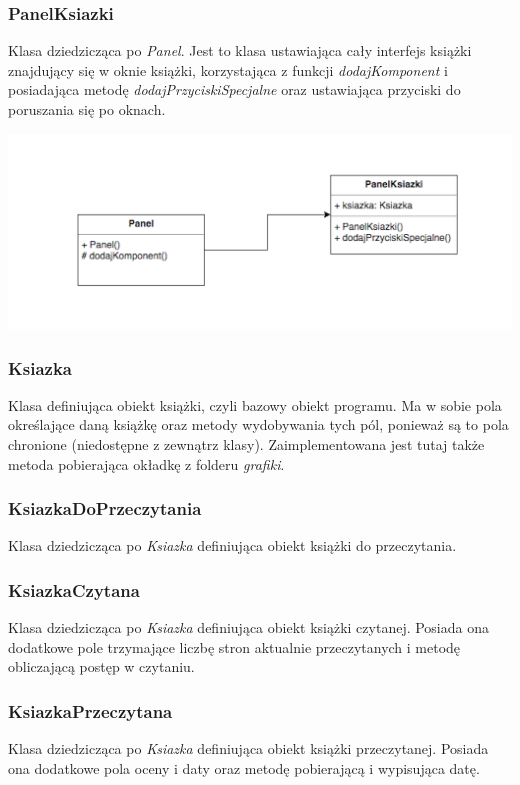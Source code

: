 \documentclass[a4paper,10pt]{article}
\begin{document}
\begin{enumerate}
\subsubsection{PanelKsiazki}
Klasa dziedzicząca po \textit{Panel}. Jest to klasa ustawiająca cały interfejs książki znajdujący się w oknie książki, korzystająca z funkcji \textit{dodajKomponent} i posiadająca metodę \textit{dodajPrzyciskiSpecjalne} oraz ustawiająca przyciski do poruszania się po oknach.

\begin{center}
\includegraphics[scale=0.18]{UML4.png}
\end{center}

\subsubsection{Ksiazka}
Klasa definiująca obiekt książki, czyli bazowy obiekt programu. Ma w sobie pola określające daną książkę oraz metody wydobywania tych pól, ponieważ są to pola chronione (niedostępne z zewnątrz klasy). Zaimplementowana jest tutaj także metoda pobierająca okładkę z folderu \textit{grafiki}.

\subsubsection{KsiazkaDoPrzeczytania}
Klasa dziedzicząca po \textit{Ksiazka} definiująca obiekt książki do przeczytania.

\subsubsection{KsiazkaCzytana} 
Klasa dziedzicząca po \textit{Ksiazka} definiująca obiekt książki czytanej. Posiada ona dodatkowe pole trzymające liczbę stron aktualnie przeczytanych i metodę obliczającą postęp w czytaniu.

\subsubsection{KsiazkaPrzeczytana}
Klasa dziedzicząca po \textit{Ksiazka} definiująca obiekt książki przeczytanej. Posiada ona dodatkowe pola oceny i daty oraz metodę pobierającą i wypisująca datę.


\end{enumerate}
\end{document}
